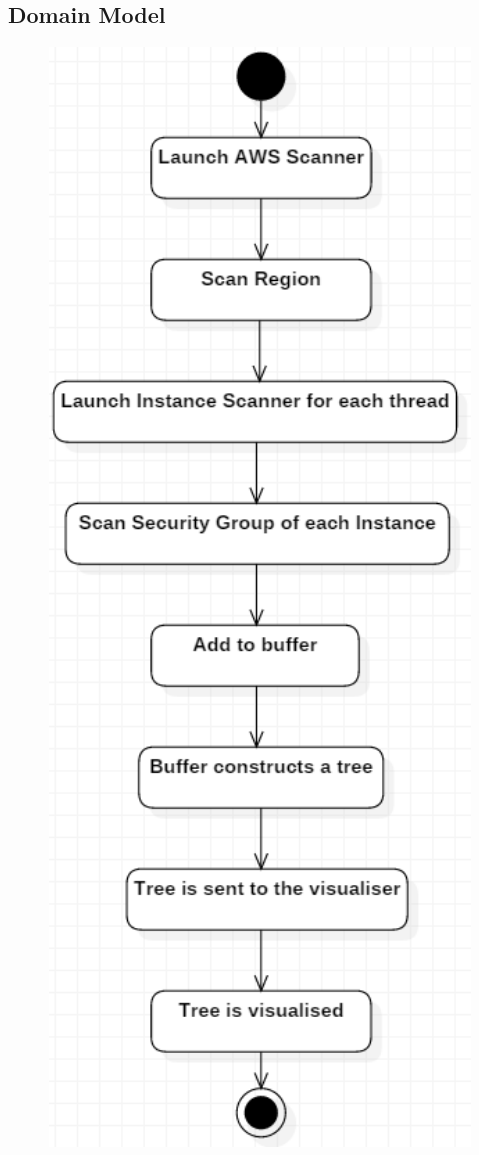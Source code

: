 \documentclass[a4paper,12pt]{report}
\begin{document}
\subsection{Domain Model}
	\begin{center}
  	  	\includegraphics[width=1\textwidth] {./Diagrams/ScanInstancesSequence.png}\\[0.4cm]    
	\end{center}
\end{document}
